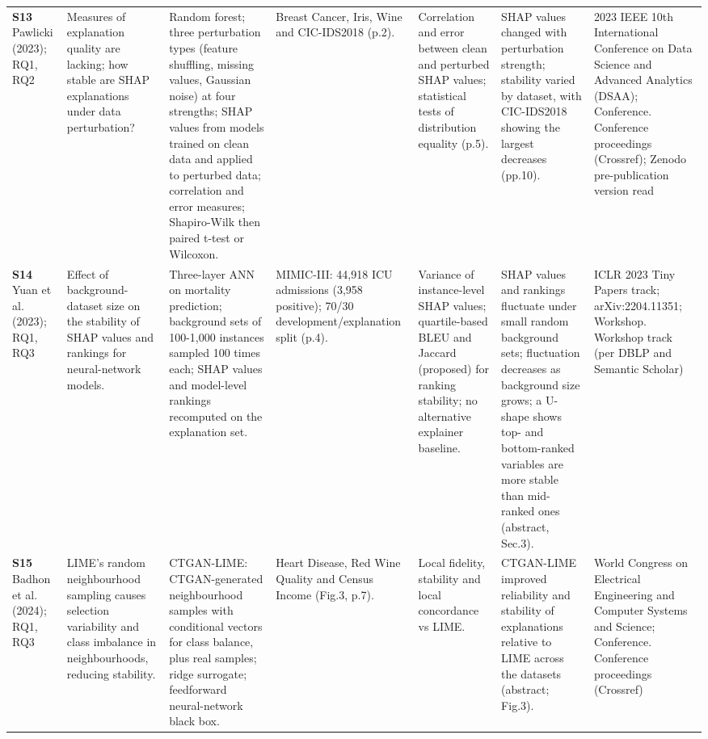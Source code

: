 \begin{longtable}{@{}P{1.55cm}P{2.9cm}P{4.5cm}P{3.2cm}P{3.4cm}P{4.6cm}P{3.6cm}@{}}
\textbf{S13} \cite{S13} Pawlicki (2023); RQ1, RQ2 & Measures of explanation quality are lacking; how stable are SHAP explanations under data perturbation? & Random forest; three perturbation types (feature shuffling, missing values, Gaussian noise) at four strengths; SHAP values from models trained on clean data and applied to perturbed data; correlation and error measures; Shapiro-Wilk then paired t-test or Wilcoxon. & Breast Cancer, Iris, Wine and CIC-IDS2018 (p.2). & Correlation and error between clean and perturbed SHAP values; statistical tests of distribution equality (p.5). & SHAP values changed with perturbation strength; stability varied by dataset, with CIC-IDS2018 showing the largest decreases (pp.10). & 2023 IEEE 10th International Conference on Data Science and Advanced Analytics (DSAA); Conference. Conference proceedings (Crossref); Zenodo pre-publication version read \\
\textbf{S14} \cite{S14} Yuan et al. (2023); RQ1, RQ3 & Effect of background-dataset size on the stability of SHAP values and rankings for neural-network models. & Three-layer ANN on mortality prediction; background sets of 100-1,000 instances sampled 100 times each; SHAP values and model-level rankings recomputed on the explanation set. & MIMIC-III: 44,918 ICU admissions (3,958 positive); 70/\allowbreak{}30 development/\allowbreak{}explanation split (p.4). & Variance of instance-level SHAP values; quartile-based BLEU and Jaccard (proposed) for ranking stability; no alternative explainer baseline. & SHAP values and rankings fluctuate under small random background sets; fluctuation decreases as background size grows; a U-shape shows top- and bottom-ranked variables are more stable than mid-ranked ones (abstract, Sec.3). & ICLR 2023 Tiny Papers track; arXiv:2204.11351; Workshop. Workshop track (per DBLP and Semantic Scholar) \\
\textbf{S15} \cite{S15} Badhon et al. (2024); RQ1, RQ3 & LIME's random neighbourhood sampling causes selection variability and class imbalance in neighbourhoods, reducing stability. & CTGAN-LIME: CTGAN-generated neighbourhood samples with conditional vectors for class balance, plus real samples; ridge surrogate; feedforward neural-network black box. & Heart Disease, Red Wine Quality and Census Income (Fig.3, p.7). & Local fidelity, stability and local concordance vs LIME. & CTGAN-LIME improved reliability and stability of explanations relative to LIME across the datasets (abstract; Fig.3). & World Congress on Electrical Engineering and Computer Systems and Science; Conference. Conference proceedings (Crossref) \\

\end{longtable}
